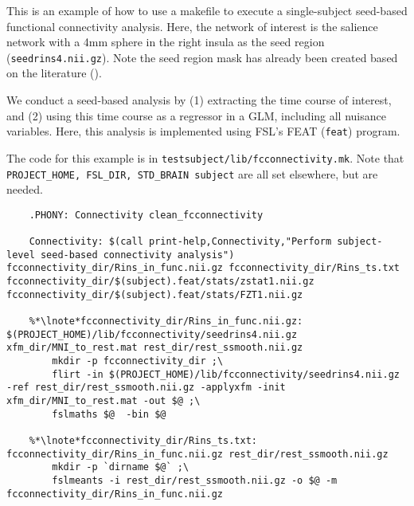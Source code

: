 \label{example:fcconnectivity}
This is an example of how to use a makefile to execute a
single-subject seed-based functional connectivity analysis. Here, the network of interest is the salience network with a 4mm sphere in the right insula as the seed region (\texttt{seedrins4.nii.gz}). Note the seed region mask has already been created based on the literature (\cite{seely2008,lee2014}).

We conduct a seed-based analysis by (1) extracting the time course of
interest, and (2) using this time course as a regressor in a GLM,
including all nuisance variables. Here, this analysis is implemented
using FSL's FEAT (\texttt{feat}) program.


The code for this example is in \texttt{testsubject/lib/fcconnectivity.mk}.
Note that \texttt{PROJECT_HOME, FSL_DIR, STD_BRAIN subject} are all set elsewhere, but are needed.

\begin{lstlisting}
	.PHONY: Connectivity clean_fcconnectivity

	Connectivity: $(call print-help,Connectivity,"Perform subject-level seed-based connectivity analysis") fcconnectivity_dir/Rins_in_func.nii.gz fcconnectivity_dir/Rins_ts.txt fcconnectivity_dir/$(subject).feat/stats/zstat1.nii.gz fcconnectivity_dir/$(subject).feat/stats/FZT1.nii.gz

	%*\lnote*fcconnectivity_dir/Rins_in_func.nii.gz: $(PROJECT_HOME)/lib/fcconnectivity/seedrins4.nii.gz xfm_dir/MNI_to_rest.mat rest_dir/rest_ssmooth.nii.gz
		mkdir -p fcconnectivity_dir ;\
		flirt -in $(PROJECT_HOME)/lib/fcconnectivity/seedrins4.nii.gz -ref rest_dir/rest_ssmooth.nii.gz -applyxfm -init xfm_dir/MNI_to_rest.mat -out $@ ;\
		fslmaths $@  -bin $@ 
	
	%*\lnote*fcconnectivity_dir/Rins_ts.txt: fcconnectivity_dir/Rins_in_func.nii.gz rest_dir/rest_ssmooth.nii.gz
		mkdir -p `dirname $@` ;\
		fslmeants -i rest_dir/rest_ssmooth.nii.gz -o $@ -m fcconnectivity_dir/Rins_in_func.nii.gz

\end{lstlisting}

